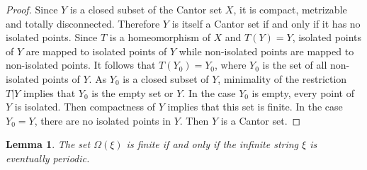\documentclass[12pt]{article}
\newtheorem{lemma}[theorem]{Lemma}
\theoremstyle{definition}
\def\Om{\Omega}
\begin{document}
\begin{proof}
Since $Y$ is a closed subset of the Cantor set $X$, it is compact, 
metrizable and totally disconnected.  Therefore $Y$ is itself a Cantor set 
if and only if it has no isolated points.  Since $T$ is a homeomorphism of 
$X$ and $T(Y)=Y$, isolated points of $Y$ are mapped to isolated points of 
$Y$ while non-isolated points are mapped to non-isolated points.  It 
follows that $T(Y_0)=Y_0$, where $Y_0$ is the set of all non-isolated 
points of $Y$.  As $Y_0$ is a closed subset of $Y$, minimality of the 
restriction $T|Y$ implies that $Y_0$ is the empty set or $Y$.  In the case 
$Y_0$ is empty, every point of $Y$ is isolated.  Then compactness of $Y$ 
implies that this set is finite.  In the case $Y_0=Y$, there are no 
isolated points in $Y$.  Then $Y$ is a Cantor set.
\end{proof}

\begin{lemma}\label{when-finite}
The set $\Om(\xi)$ is finite if and only if the infinite string $\xi$ is 
eventually periodic.
\end{lemma}
\end{document}
